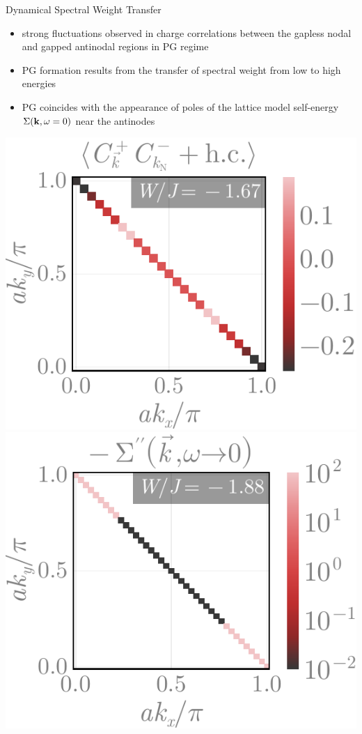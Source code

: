 \documentclass[10pt,aspectratio=169]{beamer}
\begin{document}
\begin{frame}{Dynamical Spectral Weight Transfer}
\begin{itemize}
	\item strong fluctuations observed in \alert{charge correlations} between the gapless nodal and gapped antinodal regions in PG regime
	\item PG formation results from the \alert{transfer of spectral weight} from low to high energies
	\item PG coincides with the appearance of poles of the lattice model self-energy $\Sigma ({\bf k},\omega=0)$ near the antinodes
\end{itemize}

\begin{center}
    \includegraphics[width=0.38\linewidth]{cfnode-2.pdf}
    \includegraphics[width=0.38\linewidth]{selfEnergyKspace-3.pdf}
\end{center}
\end{frame}
\end{document}
